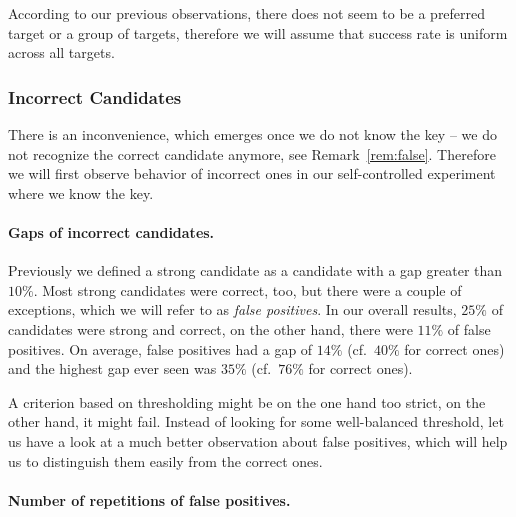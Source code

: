 	\begin{remark}
	\label{rem:uniform}
		According to our previous observations, there does not seem to be a preferred target or a group of targets, therefore we will assume that success rate is uniform across all targets.
	\end{remark}

\subsubsection{Incorrect Candidates}
	
	There is an inconvenience, which emerges once we do not know the key -- we do not recognize the correct candidate anymore, see Remark~\ref{rem:false}. Therefore we will first observe behavior of incorrect ones in our self-controlled experiment where we know the key.
	
	\paragraph{Gaps of incorrect candidates.}
		
		Previously we defined a strong candidate as a candidate with a gap greater than $10\%$. Most strong candidates were correct, too, but there were a couple of exceptions, which we will refer to as {\em false positives}. In our overall results, $25\%$ of candidates were strong and correct, on the other hand, there were $11\%$ of false positives. On average, false positives had a gap of $14\%$ (cf.\ $40\%$ for correct ones) and the highest gap ever seen was $35\%$ (cf.\ $76\%$ for correct ones).
		
		A criterion based on thresholding might be on the one hand too strict, on the other hand, it might fail. Instead of looking for some well-balanced threshold, let us have a look at a much better observation about false positives, which will help us to distinguish them easily from the correct ones.
	
	\paragraph{Number of repetitions of false positives.}
		
